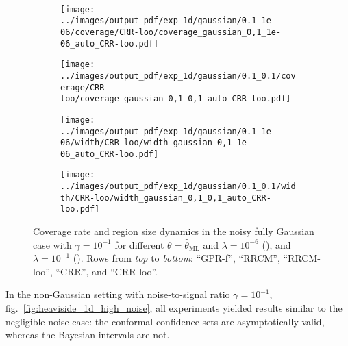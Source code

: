 \documentclass[10pt, conference, compsocconf]{IEEEtran}
\begin{document}
\begin{figure}
\begin{subfigure}[b]{0.25\linewidth}
  \end{subfigure}\\
  \begin{subfigure}[b]{0.25\linewidth}
    \texttt{[image: ../images/output\_pdf/exp\_1d/gaussian/0.1\_1e-06/coverage/CRR-loo/coverage\_gaussian\_0,1\_1e-06\_auto\_CRR-loo.pdf]}
    \caption{} \label{fig:gaussian_1d_high_noise_c3}
  \end{subfigure}%
  \begin{subfigure}[b]{0.25\linewidth}
    \texttt{[image: ../images/output\_pdf/exp\_1d/gaussian/0.1\_0.1/coverage/CRR-loo/coverage\_gaussian\_0,1\_0,1\_auto\_CRR-loo.pdf]}
    \caption{} \label{fig:gaussian_1d_high_noise_c4}
  \end{subfigure}%
  \begin{subfigure}[b]{0.25\linewidth}
    \texttt{[image: ../images/output\_pdf/exp\_1d/gaussian/0.1\_1e-06/width/CRR-loo/width\_gaussian\_0,1\_1e-06\_auto\_CRR-loo.pdf]}
    \caption{} \label{fig:gaussian_1d_high_noise_width_c3}
  \end{subfigure}%
  \begin{subfigure}[b]{0.25\linewidth}
    \texttt{[image: ../images/output\_pdf/exp\_1d/gaussian/0.1\_0.1/width/CRR-loo/width\_gaussian\_0,1\_0,1\_auto\_CRR-loo.pdf]}
    \caption{} \label{fig:gaussian_1d_high_noise_width_c4}
  \end{subfigure}
  \caption{Coverage rate and region size dynamics in the noisy fully Gaussian case
  with $\gamma=10^{-1}$ for different $\theta=\hat{\theta}_\text{ML}$ and $\lambda=10^{-6}$
  (), and $\lambda=10^{-1}$ ().
  Rows from \textit{top} to \textit{bottom}: ``GPR-f'', ``RRCM'', ``RRCM-loo'', ``CRR'', and ``CRR-loo''.}
  \label{fig:gaussian_1d_high_noise}
\end{figure}

In the non-Gaussian setting with noise-to-signal ratio $\gamma=10^{-1}$, fig.~\ref{fig:heaviside_1d_high_noise},
all experiments yielded results similar to the negligible noise case: the conformal
confidence sets are asymptotically valid, whereas the Bayesian intervals are not.
\end{document}
